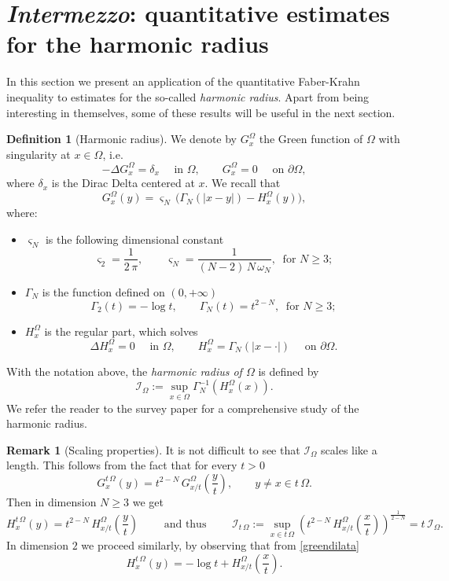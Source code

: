 \documentclass{amsart}
\theoremstyle{definition}
\newtheorem{definition}[lemma]{Definition}
\newtheorem{remark}[lemma]{Remark}
\numberwithin{equation}{section}
\begin{document}
\section{{\it Intermezzo}: quantitative estimates for the harmonic radius}
\label{sec:3}

In this section we present an application of the quantitative Faber-Krahn inequality to estimates for the so-called {\it harmonic radius}. Apart from being interesting in themselves, some of these results will be useful in the next section.
\begin{definition}[Harmonic radius] 
We denote by $G^\Omega_x$ the Green function of $\Omega$ with singularity at $x\in\Omega$, i.e.
\[
-\Delta G^\Omega_x=\delta_x\quad \mbox{ in }\Omega,\qquad G^\Omega_x=0\quad \mbox{ on }\partial\Omega,
\]
where $\delta_x$ is the Dirac Delta centered at $x$.
We recall that 
\[
G^\Omega_x(y)=\varsigma_N\,\Big(\Gamma_N(|x-y|)-H^\Omega_x(y)\Big),
\]
where:
\begin{itemize}
\item $\varsigma_N$ is the following dimensional constant
\[
\varsigma_2=\frac{1}{2\,\pi},\qquad \varsigma_N=\frac{1}{(N-2)\,N\,\omega_N},\ \mbox{ for }N\ge 3;
\]
\item $\Gamma_N$ is the function defined on $(0,+\infty)$
\[
\Gamma_2(t)=-\log t,\qquad \Gamma_N(t)=t^{2-N},\ \mbox{ for }N\ge 3;
\]
\item $H^\Omega_x$ is the regular part, which solves
\[
\Delta H^\Omega_x=0\quad \mbox{ in }\Omega,\qquad H^\Omega_x=\Gamma_N(|x-\cdot|)\quad \mbox{ on }\partial\Omega.
\]
\end{itemize}  
With the notation above, the {\it harmonic radius of $\Omega$} is defined by
\begin{equation}
\label{harmonicradius}
\mathcal{I}_\Omega:=\sup_{x\in\Omega} \Gamma_N^{-1}(H^\Omega_x(x)).
\end{equation}
We refer the reader to the survey paper \cite{MR1391227} for a comprehensive study of the harmonic radius.
\end{definition}
\begin{remark}[Scaling properties]
It is not difficult to see that $\mathcal{I}_\Omega$ scales like a length. This follows from the fact that for every $t>0$
\begin{equation}
\label{greendilata}
G^{t\,\Omega}_x(y)=t^{2-N}\,G^\Omega_{x/t}\left(\frac{y}{t}\right),\qquad y\not= x\in t\,\Omega.
\end{equation}
Then in dimension $N\ge 3$ we get 
\[
H^{t\,\Omega}_x(y)=t^{2-N}\,H^\Omega_{x/t}\left(\frac{y}{t}\right)\qquad \mbox{ and thus }\qquad \mathcal{I}_{t\,\Omega}:=\sup_{x\in t\,\Omega}\left(t^{2-N}\,H^\Omega_{x/t}\left(\frac{x}{t}\right)\right)^\frac{1}{2-N}=t\,\mathcal{I}_\Omega.
\]
In dimension $2$ we proceed similarly, by observing that from \eqref{greendilata}
\[
H^{t\,\Omega}_x(y)=-\log t+H^\Omega_{x/t}\left(\frac{x}{t}\right).
\]
\end{remark}
\end{document}
